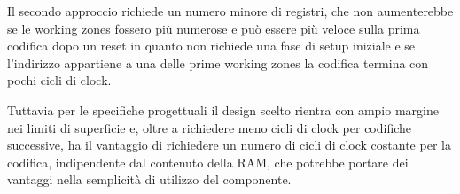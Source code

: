 \documentclass[a4paper]{article}
\begin{document}
Il secondo approccio richiede un numero minore di registri, che non aumenterebbe se le working zones fossero più numerose e può essere più veloce sulla prima codifica dopo un reset in quanto non richiede una fase di setup iniziale e se l'indirizzo appartiene a una delle prime working zones la codifica termina con pochi cicli di clock.

Tuttavia per le specifiche progettuali il design scelto rientra con ampio margine nei limiti di superficie e, oltre a richiedere meno cicli di clock per codifiche successive, ha il vantaggio di richiedere un numero di cicli di clock costante per la codifica, indipendente dal contenuto della RAM, che potrebbe portare dei vantaggi nella semplicità di utilizzo del componente.
\end{document}
